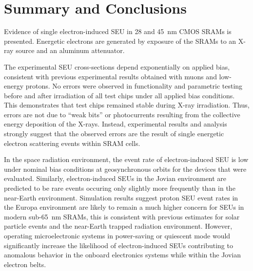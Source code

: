 \chapter{Summary and Conclusions} %
\label{cha:summary_and_conclusions}
Evidence of single electron-induced SEU in 28 and 45~nm CMOS SRAMs is presented. 
Energetic electrons are generated by exposure of the SRAMs to an X-ray source and an aluminum attenuator. 

The experimental SEU cross-sections depend exponentially on applied bias, consistent with previous experimental results obtained with muons and low-energy protons. 
No errors were observed in functionality and parametric testing before and after irradiation of all test chips under all applied bias conditions. 
This demonstrates that test chips remained stable during X-ray irradiation. 
Thus, errors are not due to ``weak bits'' or photocurrents resulting from the collective energy deposition of the X-rays. 
Instead, experimental results and analysis strongly suggest that the observed errors are the result of single energetic electron scattering events within SRAM cells. 

In the space radiation environment, the event rate of electron-induced SEU is low under nominal bias conditions at geosynchronous orbits for the devices that were evaluated. 
Similarly, electron-induced SEUs in the Jovian environment are predicted to be rare events occuring only slightly more frequently than in the near-Earth environment.
Simulation results suggest proton SEU event rates in the Europa environment are likely to remain a much higher concern for SEUs in modern sub-65~nm SRAMs, this is consistent with previous estimates for solar particle events and the near-Earth trapped radiation environment.
However, operating microelectronic systems in power-saving or quiescent mode would significantly increase the likelihood of electron-induced SEUs contributing to anomalous behavior in the onboard electronics systems while within the Jovian electron belts.


